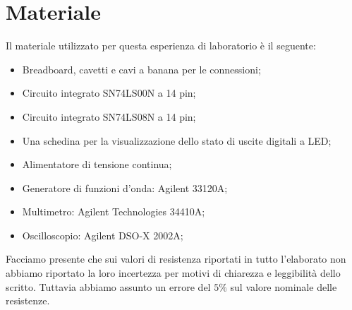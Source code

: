 \section*{Materiale}

Il materiale utilizzato per questa esperienza di laboratorio è il seguente:

\begin{itemize} \itemsep2pt \parskip0pt 
    \item{Breadboard, cavetti e cavi a banana per le connessioni;}
    \item{Circuito integrato SN74LS00N a 14 pin;}
	\item{Circuito integrato SN74LS08N a 14 pin;}
	\item{Una schedina per la visualizzazione dello stato di uscite digitali a LED;}
    \item{Alimentatore di tensione continua;}
    \item{Generatore di funzioni d'onda: Agilent 33120A;}
    \item{Multimetro: Agilent Technologies 34410A;}
    \item{Oscilloscopio: Agilent DSO-X 2002A;}
\end{itemize}

Facciamo presente che sui valori di resistenza riportati in tutto l'elaborato non abbiamo riportato la loro incertezza per motivi di chiarezza e leggibilità dello scritto. Tuttavia abbiamo assunto un errore del $5\%$ sul valore nominale delle resistenze.

